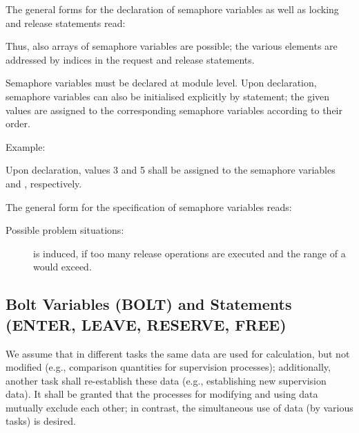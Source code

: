 The general forms for the declaration of semaphore variables as well as
locking and release statements read:

\begin{grammarframe}



\end{grammarframe}


Thus, also arrays of semaphore variables are possible; the various
elements are addressed by indices in the request and release
statements.

Semaphore variables must be declared at module level. Upon declaration,
semaphore variables can also be initialised explicitly by 
statement; the given values are assigned to the corresponding
semaphore variables according to their order.

Example:

Upon declaration, values 3 and 5 shall be assigned to the semaphore
variables  and , respectively.


The general form for the specification of semaphore variables reads:

\begin{grammarframe}

\end{grammarframe}

Possible problem situations:

\begin{description}
\item[] is induced, if too many release operations
   are executed and the range of a  would exceed.
\end{description}

\subsection{Bolt Variables (BOLT) and Statements (ENTER, LEAVE,
RESERVE, FREE)} %
\label{sec_bolt}

We assume that in different tasks the same data are used for
calculation, but not modified (e.g., comparison quantities for
supervision processes); additionally, another task shall re-establish
these data (e.g., establishing new supervision data). It shall be
granted that the processes for modifying and using data mutually exclude
each other; in contrast, the simultaneous use of data (by various tasks)
is desired.

